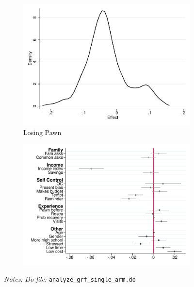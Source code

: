 \documentclass[11pt]{article}
\begin{document}
\begin{figure}[H]
\begin{center}
\begin{subfigure}{0.4\textwidth}
        \caption{Losing Pawn}
        \centering
        \includegraphics[width=\textwidth]{Figuras/he_dist_def_c_pro_5.pdf}
    \end{subfigure}
    \begin{subfigure}{0.4\textwidth}
        \caption*{}
        \centering
        \includegraphics[width=\textwidth]{Figuras/HE/he_int_vertical_def_c_pro_5.pdf}
    \end{subfigure}
    \end{center}
     \footnotesize \textit{Notes: } 
      \footnotesize{ \textit{Do file: }  \texttt{analyze\_grf\_single\_arm.do}}
\end{figure}
\end{document}
